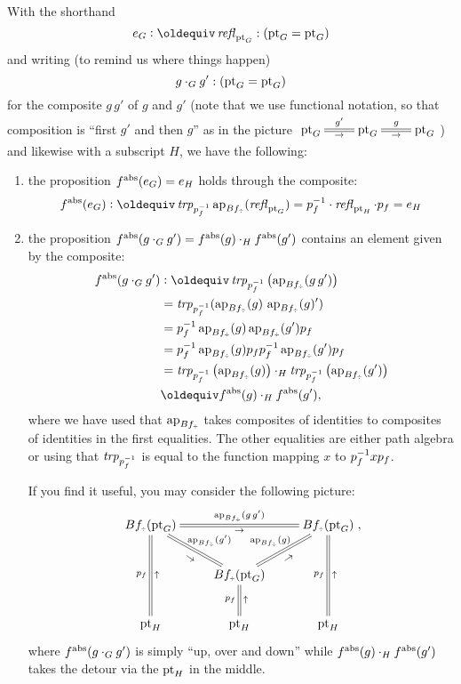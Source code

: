 \begin{remark}
With the shorthand $$e_G\defequi\refl{\pt_G}:(\pt_G=\pt_G)$$ and writing (to remind us where things happen)
$$g\cdot_Gg':(\mathrm{pt}_G=\mathrm{pt}_G)$$
 for the composite $g\,g'$ of $g$ and $g'$ (note that we use functional notation, so that composition is ``first $g'$ and then $g$'' as in the picture 
$\xymatrix{\pt_G\ar@{=}[r]^{g'}_\to&\pt_G\ar@{=}[r]^{g}_\to&\pt_G}$) %
and likewise with a subscript $H$, we have the following:
  \begin{enumerate}
  \item the proposition $f^{\mathrm{abs}}(e_G)= e_H$ holds through the
    composite:
    \begin{displaymath}
      f^\abstr(e_G)\defequi\trp {\inv{p_f}}\ap{Bf_\div}(\refl{\pt_G})
      = \inv{p_f} \cdot \refl{\pt_H} \cdot p_f = e_H
    \end{displaymath}
  \item the proposition
    $f^{\mathrm{abs}}(g\cdot_Gg')=f^{\mathrm{abs}}(g)\cdot_Hf^{\mathrm{abs}}(g')$ contains an
    element given by the composite:
    \begin{align*}
      f^\abstr(g\cdot_Gg')
      &\defequi \trp{\inv{p_f}}\left(\ap{Bf_\div}(g\, g')\right)
      \\
      &=\trp{\inv{p_f}}(\ap{Bf_\div}(g)\,\ap{Bf_\div}(g)')
      \\
      &=\inv{p_f}\ap{Bf_\div}(g)\ap{Bf_\div}(g'){p_f}
      \\
      &=\inv{p_f}\ap{Bf_\div}(g)p_f\inv{p_f}\ap{Bf_\div}(g'){p_f}
      \\
      &=\trp{\inv{p_f}}\left(\ap{Bf_\div}(g)\right)
        \cdot_H\trp{\inv{p_f}}\left(\ap{Bf_\div}(g')\right)
      \\
      &\jdeq f^\abstr(g)\cdot_Hf^\abstr(g'),
    \end{align*}
    where we have used that $\ap{Bf_\div}$ takes composites of
    identities to composites of identities in the first
    equalities. The other equalities are either path algebra or using
    that $\trp {\inv{p_f}}$ is equal to the function mapping $x$ to
    $p_f^{-1} x {p_f}$.

If you find it useful, you may consider the following picture:
\begin{displaymath}
  \xymatrix{
Bf_\div(\pt_G)\ar@{=}[rr]^{\ap{Bf_\div}(g\, g')}_\to\ar@{=}[dr]^{\ap{Bf_\div}(g')}_{\rotatebox{-35}{\footnotesize$\to$}} \ar@{=}[dd]_{p_f}^\uparrow
&&Bf_\div(\pt_G)\ar@{=}[dd]_{p_f}^\uparrow\\
&Bf_\div(\pt_G)\ar@{=}[d]_{p_f}^\uparrow
\ar@{=}[ur]^{\ap{Bf_\div}(g)}_{\rotatebox{35}{\footnotesize$\to$}}
&\\
\pt_H&\pt_H&\pt_H},
\end{displaymath}
where $f^{\mathrm{abs}}(g\cdot_Gg')$ is simply ``up, over and down'' while $f^{\mathrm{abs}}(g)\cdot_Hf^{\mathrm{abs}}(g')$ takes the detour via the $\mathrm{pt}_H$ in the middle.
  \end{enumerate}
\end{remark}
